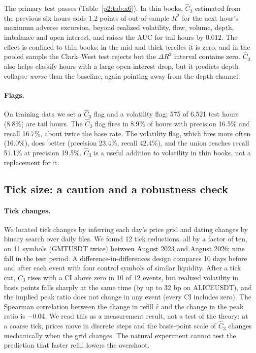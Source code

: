 The primary test passes (Table~\ref{p2:tab:x6}). In thin books, $\hat C_3$ estimated from the previous six hours adds $1.2$ points of out-of-sample $R^2$ for the next hour's maximum adverse excursion, beyond realized volatility, flow, volume, depth, imbalance and open interest, and raises the AUC for tail hours by $0.012$. The effect is confined to thin books: in the mid and thick terciles it is zero, and in the pooled sample the Clark--West test rejects but the $\Delta R^2$ interval contains zero. $\hat C_3$ also helps classify hours with a large open-interest drop, but it predicts depth collapse \emph{worse} than the baseline, again pointing away from the depth channel.

\paragraph{Flags.} On training data we set a $\hat C_3$ flag and a volatility flag; 575 of 6{,}521 test hours (8.8\%) are tail hours. The $\hat C_3$ flag fires in 8.9\% of hours with precision 16.5\% and recall 16.7\%, about twice the base rate. The volatility flag, which fires more often (16.0\%), does better (precision 23.4\%, recall 42.4\%), and the union reaches recall 51.1\% at precision 19.5\%. $\hat C_3$ is a useful addition to volatility in thin books, not a replacement for it.

\subsection{Tick size: a caution and a robustness check}\label{p2:sec:tick}

\paragraph{Tick changes.} We located tick changes by inferring each day's price grid and dating changes by binary search over daily files. We found 12 tick reductions, all by a factor of ten, on 11 symbols (GMTUSDT twice) between August 2023 and August 2026; nine fall in the test period. A difference-in-differences design compares 10 days before and after each event with four control symbols of similar liquidity. After a tick cut, $\hat C_3$ rises with a CI above zero in 10 of 12 events, but realized volatility in basis points falls sharply at the same time (by up to 32 bp on ALICEUSDT), and the implied peak ratio does not change in any event (every CI includes zero). The Spearman correlation between the change in refill $\hat r$ and the change in the peak ratio is $-0.04$. We read this as a measurement result, not a test of the theory: at a coarse tick, prices move in discrete steps and the basis-point scale of $\hat C_3$ changes mechanically when the grid changes. The natural experiment cannot test the prediction that faster refill lowers the overshoot.

